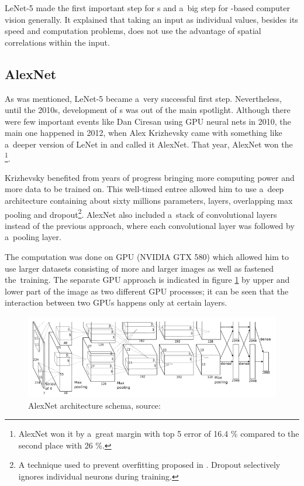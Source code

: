 LeNet-5 made the first important step for s and a~big step for 
-based computer vision generally. It explained that taking an input as 
individual values, besides its speed and computation problems, does not use 
the advantage of spatial correlations within the input. 



\subsection{AlexNet} %
\label{alexnet}

As was mentioned, LeNet-5 became a~very successful first step. Nevertheless,
until the 2010s, development of s was out of the main spotlight.
Although there were few important events like Dan Ciresan using GPU neural nets
in 2010, the main one happened in 2012, when Alex Krizhevsky came with
something like a~deeper version of LeNet in \cite{cnn-classification} and
called it AlexNet. That year, AlexNet won the \footnote{AlexNet won
it by a~great margin with top 5 error of 16.4 \% compared to the second place
with 26 \%.}.

Krizhevsky benefited from years of progress bringing more computing power and 
more data to be trained on. This well-timed entree allowed him to use a~deep 
architecture containing about sixty millions parameters,  layers, 
overlapping max pooling and dropout\footnote{A technique used to prevent 
overfitting proposed in \cite{dropout}. Dropout selectively ignores individual 
neurons during training.}. AlexNet also included a~stack of convolutional
layers instead of the previous approach, where each convolutional layer was
followed by a~pooling layer. 

The computation was done on GPU (NVIDIA GTX 580) which allowed him to use
larger datasets consisting of more and larger images as well as fastened
the~training. The separate GPU approach is indicated in figure
\ref{fig:alexnet} by upper and lower part of the image as two different GPU
processes; it can be seen that the interaction between two GPUs happens only at
certain layers. 

\begin{figure}[h]
   \centering
	\includegraphics[width=\linewidth]{./pictures/alexnet.png}
	\caption[AlexNet architecture]{AlexNet architecture schema, source: 
	\cite{cnn-classification}}
      \label{fig:alexnet}
\end{figure}

